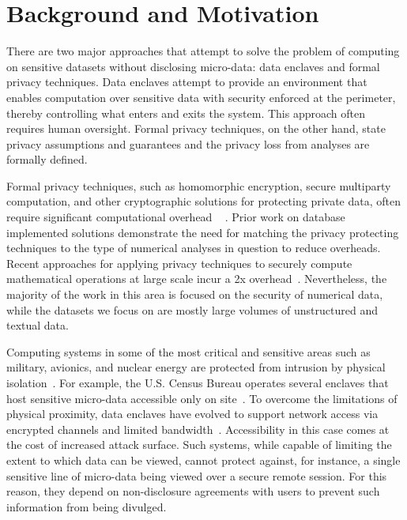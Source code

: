 \section{Background and Motivation} \label{sec:background}

There are two major approaches that attempt to solve the problem of computing on sensitive
datasets without disclosing micro-data: data enclaves and formal privacy techniques. Data enclaves attempt to
provide an environment that enables computation over sensitive data with security enforced
at the perimeter, thereby controlling what enters and exits the system. This approach often requires human oversight.
Formal privacy techniques, on the other hand, state privacy assumptions and guarantees and the privacy loss
from analyses are formally defined.

Formal privacy techniques, such as homomorphic encryption, secure multiparty computation, and
other cryptographic solutions for protecting private data, often require significant computational
overhead ~\cite{gentry2012fully} \cite{naehrig2011can}. Prior work on database implemented solutions
\cite{popa2011cryptdb} demonstrate the need for matching the privacy protecting techniques to the type of
numerical analyses in question to reduce overheads. Recent approaches for applying privacy techniques to
securely compute mathematical operations at large scale incur a 2x overhead~\cite{kepner2014computing}.
Nevertheless, the majority of the work in this area is focused on the security of numerical data, while the datasets
we focus on are mostly large volumes of unstructured and textual data.

Computing systems in some of the most critical and sensitive areas such as military, avionics,
and nuclear energy are protected from intrusion by physical isolation~\cite{byres2013air, ross2013security}.
For example, the U.S. Census Bureau operates several enclaves that host sensitive micro-data accessible
only on site~\cite{rdc_uscensus}. To overcome the limitations of physical proximity, data enclaves
have evolved to support network access via encrypted channels and limited bandwidth~\cite{lane2008using, grossman2016toward}.
Accessibility in this case comes at the cost of increased attack surface. Such systems, while
capable of limiting the extent to which data can be viewed, cannot protect against, for instance, a single
sensitive line of micro-data being viewed over a secure remote session. For this reason, they depend on non-disclosure
agreements with users to prevent such information from being divulged.

